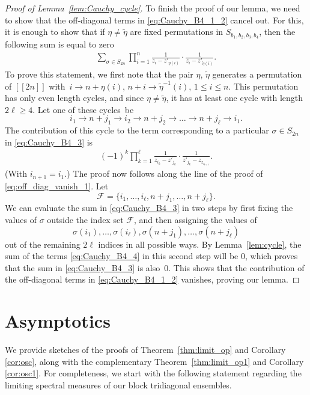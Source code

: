 \documentclass[pdftex]{sigma}
\numberwithin{equation}{section}
\theoremstyle{definition}
\newcommand{\cF}{\mathcal{F}}
\newcommand{\lst}[1]{[\![#1 ]\!]}
\begin{document}
\begin{proof}[Proof of Lemma~\ref{lem:Cauchy_cycle}]
To finish the proof of our lemma, we need to show that the off-diagonal terms in \eqref{eq:Cauchy_B4_1_2} cancel out. For this, it is enough to show that if $\eta\neq \tilde \eta$ are fixed permutations in $S_{b_1,b_2,b_3,b_4}$, then the following sum is equal to zero
\begin{align}\label{eq:Cauchy_B4_3}
 \sum_{\sigma\in S_{2n}} \prod_{i=1}^n \frac{1}{z_i-z'_{\eta(i)}}\cdot \frac{1}{z_i-z'_{\tilde \eta(i)}}.
\end{align}
To prove this statement, we first note that
the pair $\eta$, $\tilde \eta$ generates a permutation of $\lst{2n}$ with~${i\to n+\eta(i)}$, $n+i\to \tilde \eta^{-1}(i)$, $1\le i\le n$. This permutation has only even length cycles, and since $\eta\neq \tilde \eta$, it has at least one cycle with length $2\ell\ge 4$. Let one of these cycles~be
\[
i_1\to n+j_1\to i_2\to n+j_2\to \dots\to n+j_\ell\to i_1.
\]
The contribution of this cycle to the term corresponding to a particular $\sigma\in S_{2n}$ in \eqref{eq:Cauchy_B4_3} is
\begin{align}\label{eq:Cauchy_B4_4}
(-1)^k \prod_{k=1}^\ell \frac{1}{z_{i_k}-z'_{j_k}}\cdot \frac{1}{z'_{j_k}-z_{z_{i_{k+1}}}}.
\end{align}
(With $i_{n+1}=i_1$.)
The proof now follows along the line of the proof of \eqref{eq:off_diag_vanish_1}. Let
\[
\cF=\{i_1, \dots, i_\ell, n+j_1, \dots, n+j_\ell\}.
\]
We can evaluate the sum in \eqref{eq:Cauchy_B4_3} in two steps by
first fixing the values of $\sigma$ outside the index set $\cF$, and then assigning the values of
\[
\sigma(i_1), \dots, \sigma(i_\ell), \sigma(n+j_1), \dots, \sigma(n+j_\ell)
\]
out of the remaining $2\ell$ indices in all possible ways.
By Lemma~\ref{lem:cycle}, the sum of the terms \eqref{eq:Cauchy_B4_4} in this second step will be 0, which proves that the sum in \eqref{eq:Cauchy_B4_3} is also~0. This shows that the contribution of the off-diagonal terms in \eqref{eq:Cauchy_B4_1_2} vanishes, proving our lemma.
\end{proof}

\section{Asymptotics}
\label{sec:asymptotics}

We provide sketches of the proofs of Theorem~\ref{thm:limit_op} and Corollary \ref{cor:osc}, along with
the complementary Theorem~\ref{thm:limit_op1} and Corollary \ref{cor:osc1}.
For completeness, we start with the following statement regarding the limiting spectral measures of our block tridiagonal ensembles.
\end{document}
